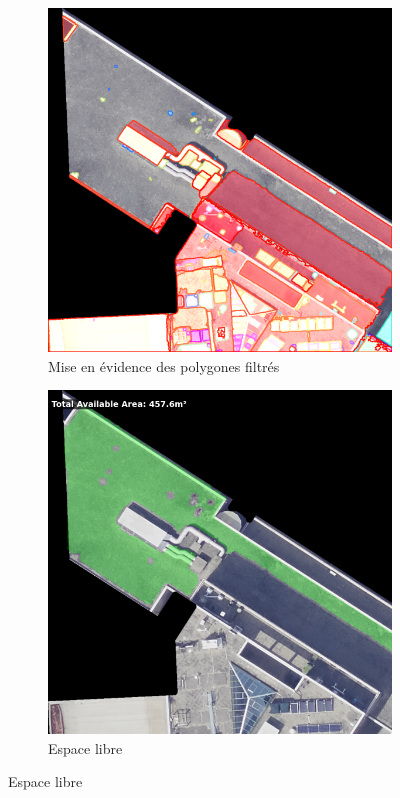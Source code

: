 \begin{figure}[H]
    \vspace{0.35cm} %
    
    \begin{subfigure}[b]{0.48\textwidth}
        \centering
        \includegraphics[width=\textwidth]{02-main/figures/ch3/ch3_essai_sam_05_filtered_masks_overlay.png}
        \caption{Mise en évidence des polygones filtrés}
        \label{fig:ch3_essai_sam_05_filtered_masks_overlay}
    \end{subfigure}
    \hfill
    \begin{subfigure}[b]{0.48\textwidth}
        \centering
        \includegraphics[width=\textwidth]{02-main/figures/ch3/ch3_essai_sam_06_une_zone_libre.png}
        \caption{Espace libre}
        \label{fig:ch3_essai_sam_06_une_zone_libre}
    \end{subfigure}


\end{figure}
